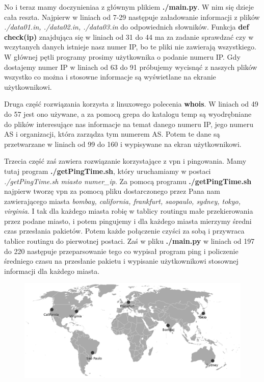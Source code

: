 \documentclass[11pt,a4paper]{article}
\begin{document}
No i teraz mamy doczynieniaa z głównym plikiem \textbf{./main.py}. W nim się dzieje cała reszta.
Najpierw w liniach od 7-29 następuje załadowanie informacji z plików \textit{./data01.in, ./data02.in, ./data03.in} do odpowiednich słowników. Funkcja \textbf{def check(ip)} znajdująca się w liniach od 31 do 44 ma za zadanie sprawdzać czy w wczytanych danych istnieje nasz numer IP, bo te pliki nie zawierają wszystkiego. W głównej pętli programy prosimy użytkownika o podanie numeru IP. Gdy dostajemy numer IP w liniach od 63 do 91 próbujemy wycisnąć z naszych plików wszystko co można i stosowne informacje są wyświetlane na ekranie użytkownikowi. 

Druga część rozwiązania korzysta z linuxowego polecenia \textbf{whois}. W liniach od 49 do 57 jest ono używane, a za pomocą grepa do katalogu temp są wyodrębniane do plików interesujące nas informacje na temat danego numeru IP, jego numeru AS i organizacji, która zarządza tym numerem AS. Potem te dane są przetwarzane w liniach od 99 do 160 i wypisywane na ekran użytkownikowi.

Trzecia część zaś zawiera rozwiązanie korzystające z vpn i pingowania. Mamy tutaj program \textbf{./getPingTime.sh}, który uruchamiamy w postaci \textit{./getPingTime.sh miasto numer\_ip}. Za pomocą programu \textbf{./getPingTime.sh} najpierw tworzę vpn za pomocą pliku dostarczonego przez Pana nam zawierającego miasta \textit{bombay, california, frankfurt, saopaulo, sydney, tokyo, virginia}. I tak dla każdego miasta robię w tablicy routingu małe przekierowania przez podane miasto, i potem pingujemy i dla każdego miasta mierzymy średni czas przesłania pakietów. Potem każde połączenie czyści za sobą i przywraca tablice routingu do pierwotnej postaci. Zaś w pliku \textbf{./main.py} w liniach od 197 do 220 następuje przeparsowanie tego co wypisał program ping i policzenie średniego czasu na przesłanie pakietu i wypisanie użytkownikowi stosownej informacji dla każdego miasta. 

\begin{figure}
\centering
\includegraphics[scale=0.4]{mapa.png}
\end{figure}
\end{document}
